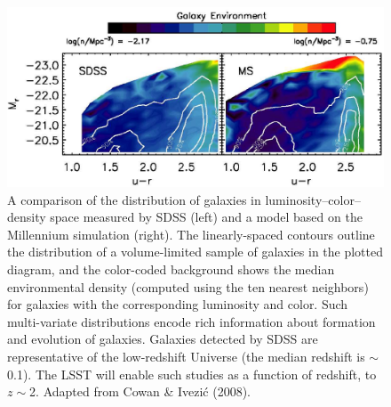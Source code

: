 \begin{figure}
\includegraphics[width=1.0\hsize,clip]{cowan.pdf}
\caption{A comparison of the distribution of galaxies in
luminosity--color--density space measured by SDSS (left) and a model based
on the Millennium simulation (right). The linearly-spaced contours outline
the distribution of a volume-limited sample of galaxies in the plotted diagram, and
the color-coded background shows the median environmental density (computed
using the ten nearest neighbors) for galaxies
with the corresponding luminosity and color. Such multi-variate distributions
encode rich information about formation and evolution of galaxies. Galaxies
detected by SDSS are representative of the low-redshift Universe (the median
redshift is $\sim$0.1). The LSST will enable such studies as a function of
redshift, to $z\sim$2. Adapted from Cowan \& Ivezi\'{c}
(2008).}
\label{Fig:cowan}
\end{figure}


